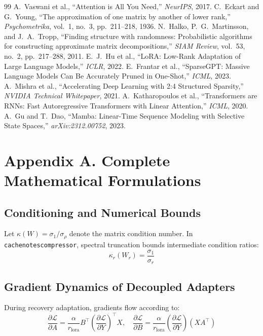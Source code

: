 \begin{thebibliography}{99}
 A.~Vaswani et al., ``Attention is All You Need,'' \emph{NeurIPS}, 2017.
 C.~Eckart and G.~Young, ``The approximation of one matrix by another of lower rank,'' \emph{Psychometrika}, vol.~1, no.~3, pp.~211--218, 1936.
 N.~Halko, P.~G.~Martinsson, and J.~A.~Tropp, ``Finding structure with randomness: Probabilistic algorithms for constructing approximate matrix decompositions,'' \emph{SIAM Review}, vol.~53, no.~2, pp.~217--288, 2011.
 E.~J.~Hu et al., ``LoRA: Low-Rank Adaptation of Large Language Models,'' \emph{ICLR}, 2022.
 E.~Frantar et al., ``SparseGPT: Massive Language Models Can Be Accurately Pruned in One-Shot,'' \emph{ICML}, 2023.
 A.~Mishra et al., ``Accelerating Deep Learning with 2:4 Structured Sparsity,'' \emph{NVIDIA Technical Whitepaper}, 2021.
 A.~Katharopoulos et al., ``Transformers are RNNs: Fast Autoregressive Transformers with Linear Attention,'' \emph{ICML}, 2020.
 A.~Gu and T.~Dao, ``Mamba: Linear-Time Sequence Modeling with Selective State Spaces,'' \emph{arXiv:2312.00752}, 2023.
\end{thebibliography}


\section*{Appendix A. Complete Mathematical Formulations}

\subsection*{Conditioning and Numerical Bounds}
Let $\kappa(W) = \sigma_1 / \sigma_\rho$ denote the matrix condition number. In \texttt{cachenotescompressor}, spectral truncation bounds intermediate condition ratios:
\[
\kappa_r(W_r) = \frac{\sigma_1}{\sigma_r}
\]

\subsection*{Gradient Dynamics of Decoupled Adapters}
During recovery adaptation, gradients flow according to:
\[
\frac{\partial \mathcal{L}}{\partial A} = \frac{\alpha}{r_{\text{lora}}} B^\top \left( \frac{\partial \mathcal{L}}{\partial Y} \right)^\top X, \quad \frac{\partial \mathcal{L}}{\partial B} = \frac{\alpha}{r_{\text{lora}}} \left( \frac{\partial \mathcal{L}}{\partial Y} \right) (X A^\top)
\]

